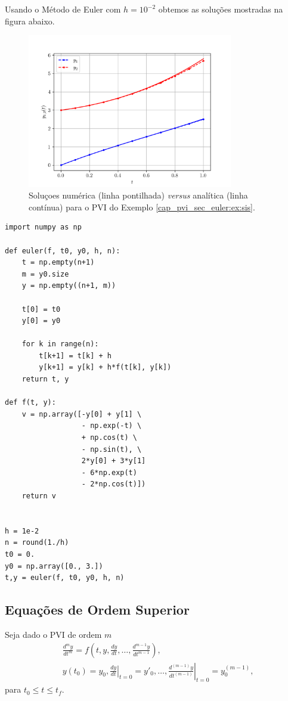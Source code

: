 \begin{ex}
  Usando o Método de Euler com $h=10^{-2}$ obtemos as soluções mostradas na figura abaixo.

  \begin{figure}[H]
    \centering
    \includegraphics[width=0.8\textwidth]{./cap_pvi/dados/fig_euler_sis/fig}
    \caption{Soluçoes numérica (linha pontilhada) \textit{versus} analítica (linha contínua) para o PVI do Exemplo \ref{cap_pvi_sec_euler:ex:sis}.}
    \label{cap_pvi_sec_euler:fig:sis}
  \end{figure}

\begin{lstlisting}
import numpy as np

def euler(f, t0, y0, h, n):
    t = np.empty(n+1)
    m = y0.size
    y = np.empty((n+1, m))

    t[0] = t0
    y[0] = y0

    for k in range(n):
        t[k+1] = t[k] + h
        y[k+1] = y[k] + h*f(t[k], y[k])
    return t, y

def f(t, y):
    v = np.array([-y[0] + y[1] \
                  - np.exp(-t) \
                  + np.cos(t) \
                  - np.sin(t), \
                  2*y[0] + 3*y[1]
                  - 6*np.exp(t)
                  - 2*np.cos(t)])
    return v


h = 1e-2
n = round(1./h)
t0 = 0.
y0 = np.array([0., 3.])
t,y = euler(f, t0, y0, h, n)
\end{lstlisting}
\end{ex}

\subsection{Equações de Ordem Superior}

Seja dado o PVI de ordem $m$
\begin{subequations}\label{cap_pvi_euler:eq:pvi_ordem_sup}
  \begin{align}
    &\frac{d^m y}{dt^m} = f\left(t, y, \frac{d y}{dt}, \dotsc, \frac{d^{m-1} y}{dt^{m-1}}\right),\\
    &y(t_0) = y_0, \left.\frac{d y}{d t}\right|_{t=0} = y'_0, \dotsc, \left.\frac{d^{(m-1)} y}{d t^{(m-1)}}\right|_{t=0} = y^{(m-1)}_0,
  \end{align}
\end{subequations}
para $t_0 \leq t \leq t_f$.

